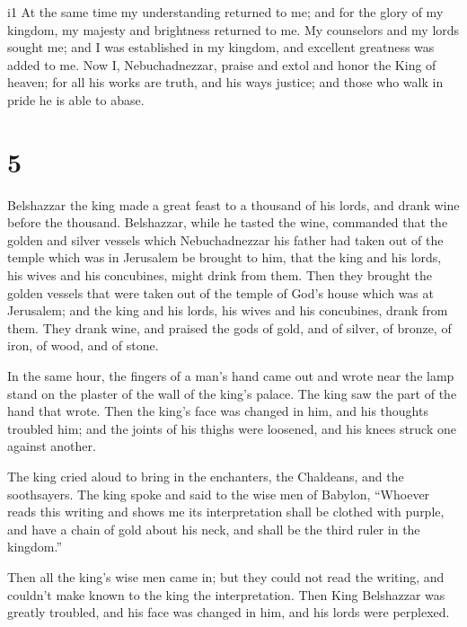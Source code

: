 i1  At the same time my understanding returned to me; and
for the glory of my kingdom, my majesty and brightness returned to me.
My counselors and my lords sought me; and I was established in my
kingdom, and excellent greatness was added to me.  Now I,
Nebuchadnezzar, praise and extol and honor the King of heaven; for all
his works are truth, and his ways justice; and those who walk in pride
he is able to abase.

\hypertarget{section-4}{%
\section{5}\label{section-4}}

 Belshazzar the king made a great feast to a thousand of
his lords, and drank wine before the thousand. 
Belshazzar, while he tasted the wine, commanded that the golden and
silver vessels which Nebuchadnezzar his father had taken out of the
temple which was in Jerusalem be brought to him, that the king and his
lords, his wives and his concubines, might drink from them.
 Then they brought the golden vessels that were taken out
of the temple of God's house which was at Jerusalem; and the king and
his lords, his wives and his concubines, drank from them. 
They drank wine, and praised the gods of gold, and of silver, of bronze,
of iron, of wood, and of stone.

 In the same hour, the fingers of a man's hand came out
and wrote near the lamp stand on the plaster of the wall of the king's
palace. The king saw the part of the hand that wrote. 
Then the king's face was changed in him, and his thoughts troubled him;
and the joints of his thighs were loosened, and his knees struck one
against another.

 The king cried aloud to bring in the enchanters, the
Chaldeans, and the soothsayers. The king spoke and said to the wise men
of Babylon, ``Whoever reads this writing and shows me its interpretation
shall be clothed with purple, and have a chain of gold about his neck,
and shall be the third ruler in the kingdom.''

 Then all the king's wise men came in; but they could not
read the writing, and couldn't make known to the king the
interpretation.  Then King Belshazzar was greatly
troubled, and his face was changed in him, and his lords were perplexed.


